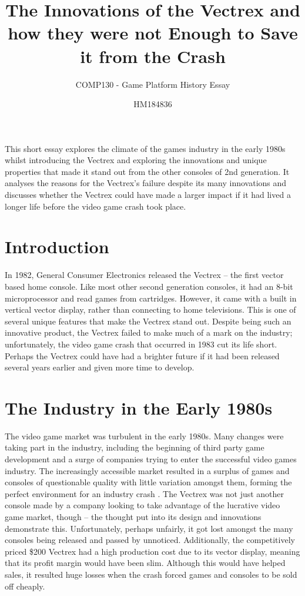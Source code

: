 \documentclass{scrartcl}
\title{The Innovations of the Vectrex and how they were not Enough to Save it from the Crash}
\subtitle{COMP130 - Game Platform History Essay}
\author{HM184836}
\begin{document}
\maketitle


\abstract
{
This short essay explores the climate of the games industry in the early 1980s whilst introducing the Vectrex and exploring the innovations and unique properties that made it stand out from the other consoles of 2nd generation. It analyses the reasons for the Vectrex's failure despite its many innovations and discusses whether the Vectrex could have made a larger impact if it had lived a longer life before the video game crash took place.
}



\section*{Introduction}
In 1982, General Consumer Electronics released the Vectrex -- the first vector based home console. Like most other second generation consoles, it had an 8-bit microprocessor and read games from cartridges. However, it came with a built in vertical vector display, rather than connecting to home televisions. This is one of several unique features that make the Vectrex stand out. Despite being such an innovative product, the Vectrex failed to make much of a mark on the industry; unfortunately, the video game crash that occurred in 1983 cut its life short. Perhaps the Vectrex could have had a brighter future if it had been released several years earlier and given more time to develop.



\section*{The Industry in the Early 1980s}
The video game market was turbulent in the early 1980s. Many changes were taking part in the industry, including the beginning of third party game development and a surge of companies trying to enter the successful video games industry\cite{wolf:pong}. The increasingly accessible market resulted in a surplus of games and consoles of questionable quality with little variation amongst them, forming the perfect environment for an industry crash \cite{ernkvist:crash}. The Vectrex was not just another console made by a company looking to take advantage of the lucrative video game market, though -- the thought put into its design and innovations demonstrate this. Unfortunately, perhaps unfairly, it got lost amongst the many consoles being released and passed by unnoticed. Additionally, the competitively priced \$200\cite{defanti:impact} Vectrex had a high production cost due to its vector display, meaning that its profit margin would have been slim. Although this would have helped sales, it resulted huge losses when the crash forced games and consoles to be sold off cheaply\cite{baer:supercade}.
\end{document}
